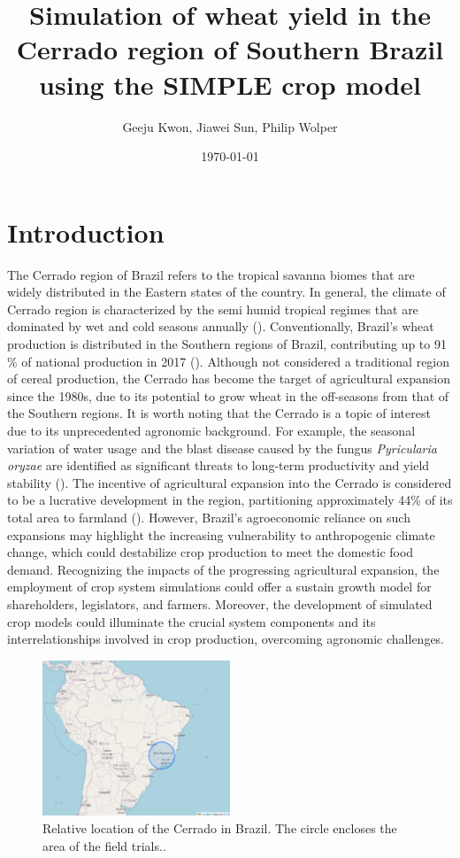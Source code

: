\documentclass[11pt]{article}
\author{Geeju Kwon, Jiawei Sun, Philip Wolper}
\date{\today}
\title{Simulation of wheat yield in the Cerrado region of Southern Brazil using the SIMPLE crop model}
\begin{document}
\maketitle

\section{Introduction}
\label{sec:org41ddfed}
The Cerrado region of Brazil refers to the tropical savanna biomes that are widely distributed in the Eastern states of the country. In general, the climate of Cerrado region is characterized by the semi humid tropical regimes that are dominated by wet and cold seasons annually (\cite{soares-2020-charac-wheat}).
Conventionally, Brazil’s wheat production is distributed in the Southern regions of Brazil, contributing up to 91 \% of national production in 2017 (\cite{lahsen-2016-under-overex}).
Although not considered a traditional region of cereal production, the Cerrado has become the target of agricultural expansion since the 1980s, due to its potential to grow wheat in the off-seasons from that of the Southern regions. It is worth noting that the Cerrado is a topic of interest due to its unprecedented agronomic background.
For example, the seasonal variation of water usage and the blast disease caused by the fungus \emph{Pyricularia oryzae} are identified as significant threats to long-term productivity and yield stability (\cite{pasinato-2018-poten-area}). The incentive of agricultural expansion into the Cerrado is considered to be a lucrative development in the region, partitioning approximately 44\% of its total area to farmland (\cite{lahsen-2016-under-overex}). However, Brazil’s agroeconomic reliance on such expansions may highlight the increasing vulnerability to anthropogenic climate change, which could destabilize crop production to meet the domestic food demand.
Recognizing the impacts of the progressing agricultural expansion, the employment of crop system simulations could offer a sustain growth model for shareholders, legislators, and farmers. Moreover, the development of simulated crop models could illuminate the crucial system components and its interrelationships involved in crop production, overcoming agronomic challenges.

\begin{figure}[htbp]
\centering
\includegraphics[width=0.5\textwidth]{./figures/Brazil with cerrado.png}
\caption{Relative location of the Cerrado in Brazil. The circle encloses the area of the field trials..}
\end{figure}
\end{document}
